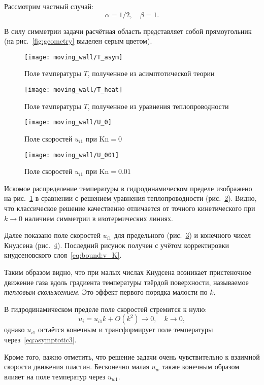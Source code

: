 \documentclass[english,russian,a4paper,10pt]{article}
\newcommand{\Kn}{\mathrm{Kn}}
\begin{document}
Рассмотрим частный случай:
\[\alpha=1/2, \quad \beta = 1. \]

В силу симметрии задачи расчётная область представляет собой прямоугольник
(на рис.~\ref{fig:geometry} выделен серым цветом).

\begin{figure}[ht]
	\centering
	\texttt{[image: moving\_wall/T\_asym]}
	\caption{Поле температуры \(T\), полученное из асимптотической теории}
	\label{fig:moving:T_asym}
\end{figure}

\begin{figure}[ht]
	\centering
	\texttt{[image: moving\_wall/T\_heat]}
	\caption{Поле температуры \(T\), полученное из уравнения теплопроводности}
	\label{fig:moving:T_heat}
\end{figure}

\begin{figure}[ht]
	\centering
	\texttt{[image: moving\_wall/U\_0]}
	\caption{Поле скоростей \(u_{i1}\) при \(\Kn=0\)}\label{fig:moving:fluid}
\end{figure}

\begin{figure}[ht]
	\centering
	\texttt{[image: moving\_wall/U\_001]}
	\caption{Поле скоростей \(u_{i1}\) при \(\Kn=0.01\) }\label{fig:moving:kn001}
\end{figure}

Искомое распределение температуры в гидродинамическом пределе изображено
на рис.~\ref{fig:moving:T_asym} в сравнении с решением уравнения теплопроводности (рис.~\ref{fig:moving:T_heat}).
Видно, что классическое решение качественно отличается от точного кинетического при \(k\to0\)
наличием симметрии в изотермических линиях.

Далее показано поле скоростей \(u_{i1}\) для предельного (рис.~\ref{fig:moving:fluid})
и конечного чисел Кнудсена (рис.~\ref{fig:moving:kn001}).
Последний рисунок получен с учётом корректировки кнудсеновского слоя~\eqref{eq:bound:v_K}.

Таким образом видно, что при малых числах Кнудсена возникает пристеночное движение газа
вдоль градиента температуры твёрдой поверхности, называемое \textit{тепловым скольжением}.
Это эффект первого порядка малости по \(k\).

В гидродинамическом пределе поле скоростей стремится к нулю:
\[ u_i = u_{i1}k + O(k^2) \to 0, \quad k\to0,\]
однако \(u_{i1}\) остаётся конечным и трансформирует поле температуры через~\eqref{eq:asymptotic3}.

Кроме того, важно отметить, что решение задачи очень чувствительно к взаимной скорости движения пластин.
Бесконечно малая \(u_w\) также конечным образом влияет на поле температур через \(u_{w1}\).
\end{document}
